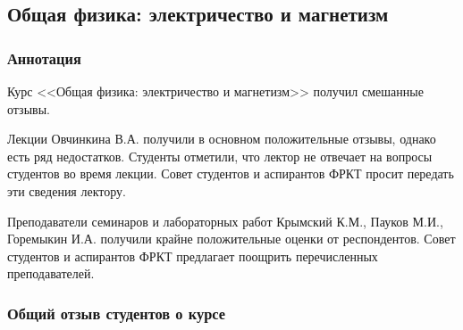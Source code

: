 \subsection{Общая физика: электричество и магнетизм}
	
	\subsubsection{Аннотация}

	Курс <<Общая физика: электричество и магнетизм>> получил смешанные отзывы.

	Лекции Овчинкина В.А. получили в основном положительные отзывы, однако есть ряд недостатков. Студенты отметили, что лектор не отвечает на вопросы студентов во время лекции. Совет студентов и аспирантов ФРКТ просит передать эти сведения лектору.
	
	Преподаватели семинаров и лабораторных работ Крымский К.М., Пауков М.И., Горемыкин И.А. получили крайне положительные оценки от респондентов. Совет студентов и аспирантов ФРКТ предлагает поощрить перечисленных преподавателей.

	\subsubsection{Общий отзыв студентов о курсе}


